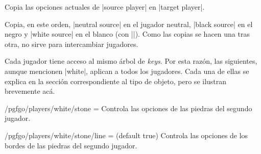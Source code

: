\begin{goban}[9, stone = {radius = 4pt}, mark = {line = {color = red}}]
\begin{command}{\pgfgosetallplayers{}}
\begin{codeexample}[width=4cm]
		\begin{goban}[3]
		\end{goban}
	\end{codeexample}
\end{command}

\begin{command}{\pgfgocopyplayer{}}
	Copia las opciones actuales de |source player| en |target player|.

	\begin{codeexample}[width=3cm]

		\begin{goban}[partial = A1:C3]
		\end{goban}
	\end{codeexample}
\end{command}

\begin{command}{\pgfgocopyplayers{}}
	Copia, en este orden, |neutral source| en el jugador neutral, |black source| en el negro y |white source| en el blanco (con |\pgfgocopyplayer|). Como las copias se hacen una tras otra, no sirve para intercambiar jugadores.

	\begin{codeexample}[width=4cm]

		\begin{goban}[3]
		\end{goban}
	\end{codeexample}
\end{command}

\label{subsec:jugadores}Cada jugador tiene acceso al mismo árbol de \emph{keys}. Por esta razón, las siguientes, aunque mencionen |white|, aplican a todos los jugadores. Cada una de ellas se explica en la sección correspondiente al tipo de objeto, pero se ilustran brevemente ac\'a.

\begin{key}{/pgfgo/players/white/stone = }
	Controla las opciones de las piedras del segundo jugador.
\end{key}

\begin{key}{/pgfgo/players/white/stone/line =  (default true)}
	Controla las opciones de los bordes de las piedras del segundo jugador.
\end{key}


\end{goban}
